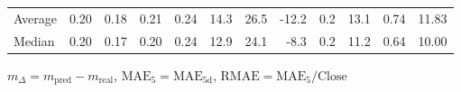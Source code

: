 \begin{threeparttable}
{\begin{tabular}{lrrrrrrrrrrr}
Average &          0.20 &          0.18 &          0.21 &        0.24 &                14.3 &                26.5 &      -12.2 &                 0.2 &             13.1 &            0.74 &                  11.83 \\
 Median &          0.20 &          0.17 &          0.20 &        0.24 &                12.9 &                24.1 &       -8.3 &                 0.2 &             11.2 &            0.64 &                  10.00 \\
\bottomrule
\end{tabular}
}
\begin{tablenotes}\footnotesize
\item $m_\Delta=m_{\text{pred}}-m_{\text{real}}$,
$\mathrm{MAE}_5=\mathrm{MAE}_{5\text{d}}$,
$\mathrm{RMAE}=\mathrm{MAE}_5/\text{Close}$
\end{tablenotes}
\end{threeparttable}
\endgroup

